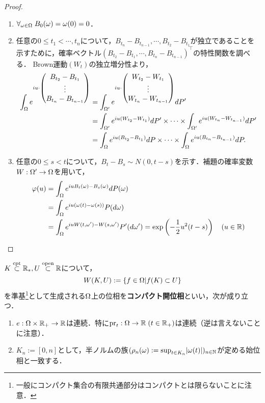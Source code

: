 \documentclass[uplatex,dvipdfmx]{jsreport}
\begin{document}
\begin{proof}
\begin{enumerate}
        \begin{enumerate}[({B}1)]
            \item $\forall_{\omega\in\Omega}\;B_0(\omega)=\omega(0)=0$．
            \item 任意の$0\le t_1<\cdots,t_n$について，$B_{t_n}-B_{t_{n-1}},\cdots,B_{t_2}-B_{t_1}$が独立であることを示すために，確率ベクトル$(B_{t_2}-B_{t_1},\cdots,B_{t_n}-B_{t_{n-1}})^\top$の特性関数を調べる．
            Brown運動$(W_t)$の独立増分性より，
            \begin{align*}
                \int_\Omega e^{iu\cdot \begin{pmatrix}B_{t_2}-B_{t_1}\\\vdots\\B_{t_n}-B_{t_{n-1}}\end{pmatrix}}&=\int_{\Omega'}e^{iu\cdot \begin{pmatrix}W_{t_2}-W_{t_1}\\\vdots\\W_{t_n}-W_{t_{n-1}}\end{pmatrix}}dP'\\
                &=\int_{\Omega'}e^{iu(W_{t_2}-W_{t_1})}dP'\times\cdots\times\int_{\Omega'}e^{iu(W_{t_n}-W_{t_{n-1}})}dP'\\
                &=\int_\Omega e^{iu(B_{t_2}-B_{t_1})}dP\times\cdots\times\int_\Omega e^{iu(B_{t_n}-B_{t_{n-1}})}dP.
            \end{align*}
            \item 任意の$0\le s<t$について，$B_t-B_s\sim N(0,t-s)$を示す．補題の確率変数$W:\Omega'\to\Omega$を用いて，
            \begin{align*}
                \varphi(u)&=\int_\Omega e^{iuB_t(\omega)-B_s(\omega)}dP(\omega)\\
                &=\int_\Omega e^{iu(\omega(t)-\omega(s))}P(d\omega)\\
                &=\int_\Omega e^{iu W(t,\omega')-W(s,\omega')}P'(d\omega')=\exp\left(-\frac{1}{2}u^2(t-s)\right)\quad(u\in\mathbb{R})
            \end{align*}
        \end{enumerate}
    \end{enumerate}
\end{proof}

\begin{lemma}[コンパクト開位相の性質]
    $K\overset{\textrm{cpt}}{\subset}\mathbb{R}_*,U\overset{\mathrm{open}}{\subset}\mathbb{R}$について，
    \[W(K,U):=\left\{f\in\Omega| f(K)\subset U\right\}\]
    を準基\footnote{一般にコンパクト集合の有限共通部分はコンパクトとは限らないことに注意．}として生成される$\Omega$上の位相を\textbf{コンパクト開位相}といい，次が成り立つ．
    \begin{enumerate}
        \item $e:\Omega\times\mathbb{R}_+\to\mathbb{R}$は連続．特に$\mathrm{pr}_t:\Omega\to\mathbb{R}\;(t\in\mathbb{R}_+)$は連続（逆は言えないことに注意）．
        \item $K_n:=[0,n]$として，半ノルムの族$(\rho_n(\omega):=\sup_{t\in K_n}\lvert\omega(t)\rvert)_{n\in\mathbb{N}}$が定める始位相と一致する．
    \end{enumerate}
\end{lemma}
\end{document}
